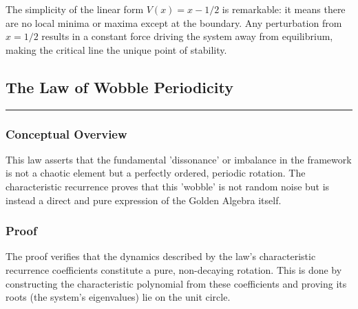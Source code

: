 The simplicity of the linear form $V(x) = x - 1/2$ is remarkable: it means there are no local minima or maxima except at the boundary. Any perturbation from $x = 1/2$ results in a constant force driving the system away from equilibrium, making the critical line the unique point of stability.


\subsection*{The Law of Wobble Periodicity}
\hrule
\vspace{0.3cm}
\vspace{0.5cm}

\subsubsection*{Conceptual Overview}
This law asserts that the fundamental 'dissonance' or imbalance in the framework is not a chaotic element but a perfectly ordered, periodic rotation. The characteristic recurrence proves that this 'wobble' is not random noise but is instead a direct and pure expression of the Golden Algebra itself.

\subsubsection*{Proof}
The proof verifies that the dynamics described by the law's characteristic recurrence coefficients constitute a pure, non-decaying rotation. This is done by constructing the characteristic polynomial from these coefficients and proving its roots (the system's eigenvalues) lie on the unit circle.

